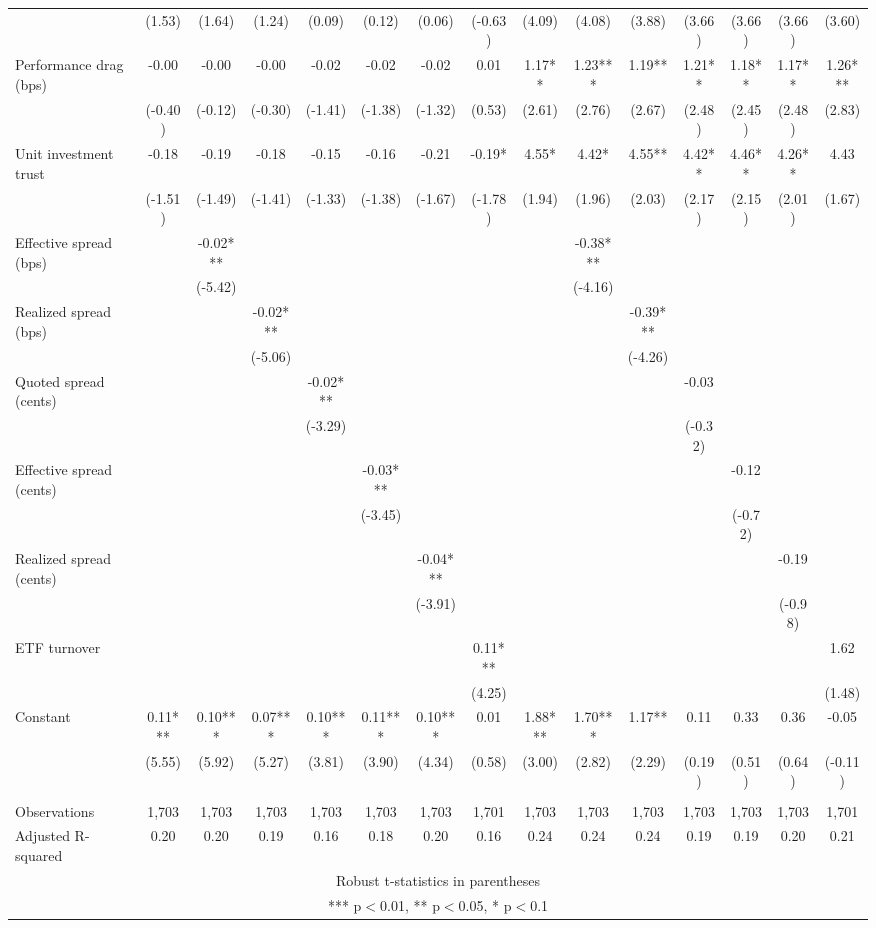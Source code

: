 \documentclass[]{article}
\begin{document}
\begin{tabular}{lcccccccccccccc}
 & (1.53) & (1.64) & (1.24) & (0.09) & (0.12) & (0.06) & (-0.63) & (4.09) & (4.08) & (3.88) & (3.66) & (3.66) & (3.66) & (3.60) \\
Performance drag (bps) & -0.00 & -0.00 & -0.00 & -0.02 & -0.02 & -0.02 & 0.01 & 1.17** & 1.23*** & 1.19** & 1.21** & 1.18** & 1.17** & 1.26*** \\
 & (-0.40) & (-0.12) & (-0.30) & (-1.41) & (-1.38) & (-1.32) & (0.53) & (2.61) & (2.76) & (2.67) & (2.48) & (2.45) & (2.48) & (2.83) \\
Unit investment trust & -0.18 & -0.19 & -0.18 & -0.15 & -0.16 & -0.21 & -0.19* & 4.55* & 4.42* & 4.55** & 4.42** & 4.46** & 4.26** & 4.43 \\
 & (-1.51) & (-1.49) & (-1.41) & (-1.33) & (-1.38) & (-1.67) & (-1.78) & (1.94) & (1.96) & (2.03) & (2.17) & (2.15) & (2.01) & (1.67) \\
Effective spread (bps) &  & -0.02*** &  &  &  &  &  &  & -0.38*** &  &  &  &  &  \\
 &  & (-5.42) &  &  &  &  &  &  & (-4.16) &  &  &  &  &  \\
Realized spread (bps) &  &  & -0.02*** &  &  &  &  &  &  & -0.39*** &  &  &  &  \\
 &  &  & (-5.06) &  &  &  &  &  &  & (-4.26) &  &  &  &  \\
Quoted spread (cents) &  &  &  & -0.02*** &  &  &  &  &  &  & -0.03 &  &  &  \\
 &  &  &  & (-3.29) &  &  &  &  &  &  & (-0.32) &  &  &  \\
Effective spread (cents) &  &  &  &  & -0.03*** &  &  &  &  &  &  & -0.12 &  &  \\
 &  &  &  &  & (-3.45) &  &  &  &  &  &  & (-0.72) &  &  \\
Realized spread (cents) &  &  &  &  &  & -0.04*** &  &  &  &  &  &  & -0.19 &  \\
 &  &  &  &  &  & (-3.91) &  &  &  &  &  &  & (-0.98) &  \\
ETF turnover &  &  &  &  &  &  & 0.11*** &  &  &  &  &  &  & 1.62 \\
 &  &  &  &  &  &  & (4.25) &  &  &  &  &  &  & (1.48) \\
Constant & 0.11*** & 0.10*** & 0.07*** & 0.10*** & 0.11*** & 0.10*** & 0.01 & 1.88*** & 1.70*** & 1.17** & 0.11 & 0.33 & 0.36 & -0.05 \\
 & (5.55) & (5.92) & (5.27) & (3.81) & (3.90) & (4.34) & (0.58) & (3.00) & (2.82) & (2.29) & (0.19) & (0.51) & (0.64) & (-0.11) \\
 &  &  &  &  &  &  &  &  &  &  &  &  &  &  \\
Observations & 1,703 & 1,703 & 1,703 & 1,703 & 1,703 & 1,703 & 1,701 & 1,703 & 1,703 & 1,703 & 1,703 & 1,703 & 1,703 & 1,701 \\
 Adjusted R-squared & 0.20 & 0.20 & 0.19 & 0.16 & 0.18 & 0.20 & 0.16 & 0.24 & 0.24 & 0.24 & 0.19 & 0.19 & 0.20 & 0.21 \\ \hline
\multicolumn{15}{c}{ Robust t-statistics in parentheses} \\
\multicolumn{15}{c}{ *** p$<$0.01, ** p$<$0.05, * p$<$0.1} \\
\end{tabular}
\end{document}
